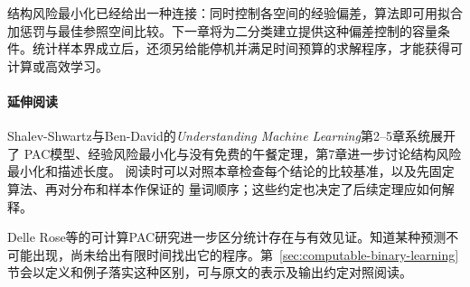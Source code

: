 结构风险最小化已经给出一种连接：同时控制各空间的经验偏差，算法即可用拟合加惩罚与最佳参照空间比较。下一章将为二分类建立提供这种偏差控制的容量条件。统计样本界成立后，还须另给能停机并满足时间预算的求解程序，才能获得可计算或高效学习。

\paragraph{延伸阅读}
Shalev-Shwartz与Ben-David的\textit{Understanding Machine Learning}第2--5章系统展开了
PAC模型、经验风险最小化与没有免费的午餐定理，第7章进一步讨论结构风险最小化和描述长度。
阅读时可以对照本章检查每个结论的比较基准，以及先固定算法、再对分布和样本作保证的
量词顺序；这些约定也决定了后续定理应如何解释。

Delle Rose等的可计算PAC研究进一步区分统计存在与有效见证。知道某种预测不可能出现，尚未给出有限时间找出它的程序。第~\ref{sec:computable-binary-learning}节会以定义和例子落实这种区别，可与原文的表示及输出约定对照阅读。
